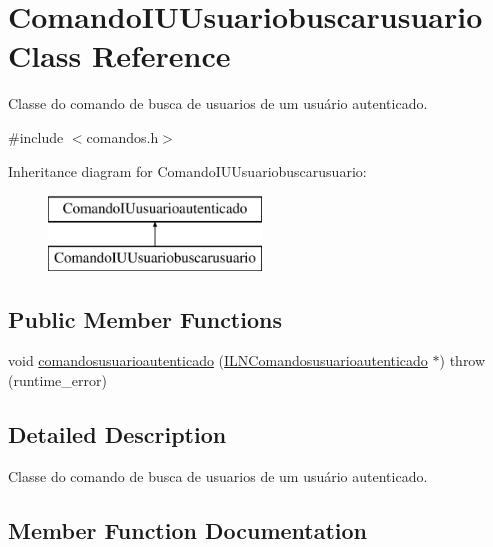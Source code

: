 \hypertarget{classComandoIUUsuariobuscarusuario}{}\section{Comando\+I\+U\+Usuariobuscarusuario Class Reference}
\label{classComandoIUUsuariobuscarusuario}


Classe do comando de busca de usuarios de um usuário autenticado.  




{\ttfamily \#include $<$comandos.\+h$>$}

Inheritance diagram for Comando\+I\+U\+Usuariobuscarusuario\+:\begin{figure}[H]
\begin{center}
\leavevmode
\includegraphics[height=2.000000cm]{classComandoIUUsuariobuscarusuario}
\end{center}
\end{figure}
\subsection*{Public Member Functions}
\begin{DoxyCompactItemize}
\item 
void \hyperlink{classComandoIUUsuariobuscarusuario_af1bcc7671932c7394b3c1b459e64b574}{comandosusuarioautenticado} (\hyperlink{classILNComandosusuarioautenticado}{I\+L\+N\+Comandosusuarioautenticado} $\ast$)  throw (runtime\+\_\+error)
\end{DoxyCompactItemize}


\subsection{Detailed Description}
Classe do comando de busca de usuarios de um usuário autenticado. 

\subsection{Member Function Documentation}
\mbox{\label{classComandoIUUsuariobuscarusuario_af1bcc7671932c7394b3c1b459e64b574}} 
